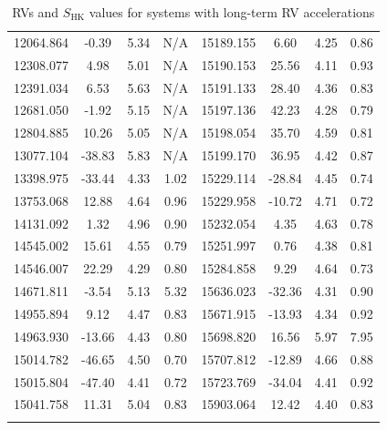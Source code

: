 {\begin{longtable}{l|ccc||l|ccc}
12064.864 & -0.39 & 5.34 & N/A & 15189.155 & 6.60 & 4.25 & 0.86 \\  
12308.077 & 4.98 & 5.01 & N/A & 15190.153 & 25.56 & 4.11 & 0.93 \\  
12391.034 & 6.53 & 5.63 & N/A & 15191.133 & 28.40 & 4.36 & 0.83 \\  
12681.050 & -1.92 & 5.15 & N/A & 15197.136 & 42.23 & 4.28 & 0.79 \\  
12804.885 & 10.26 & 5.05 & N/A & 15198.054 & 35.70 & 4.59 & 0.81 \\  
13077.104 & -38.83 & 5.83 & N/A & 15199.170 & 36.95 & 4.42 & 0.87 \\  
13398.975 & -33.44 & 4.33 & 1.02 & 15229.114 & -28.84 & 4.45 & 0.74 \\  
13753.068 & 12.88 & 4.64 & 0.96 & 15229.958 & -10.72 & 4.71 & 0.72 \\  
14131.092 & 1.32 & 4.96 & 0.90 & 15232.054 & 4.35 & 4.63 & 0.78 \\  
14545.002 & 15.61 & 4.55 & 0.79 & 15251.997 & 0.76 & 4.38 & 0.81 \\  
14546.007 & 22.29 & 4.29 & 0.80 & 15284.858 & 9.29 & 4.64 & 0.73 \\  
14671.811 & -3.54 & 5.13 & 5.32 & 15636.023 & -32.36 & 4.31 & 0.90 \\  
14955.894 & 9.12 & 4.47 & 0.83 & 15671.915 & -13.93 & 4.34 & 0.92 \\  
14963.930 & -13.66 & 4.43 & 0.80 & 15698.820 & 16.56 & 5.97 & 7.95 \\  
15014.782 & -46.65 & 4.50 & 0.70 & 15707.812 & -12.89 & 4.66 & 0.88 \\  
15015.804 & -47.40 & 4.41 & 0.72 & 15723.769 & -34.04 & 4.41 & 0.92 \\  
15041.758 & 11.31 & 5.04 & 0.83 & 15903.064 & 12.42 & 4.40 & 0.83  \\
\hline
\caption{RVs and $S_{\textrm{HK}}$ values for systems with long-term RV accelerations}
\label{Txx}
\end{longtable}
}




